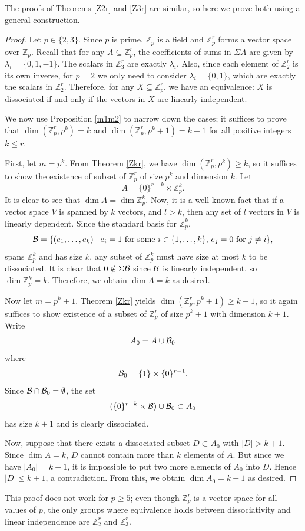 \documentclass[11pt]{article}
\newcommand{\Z}{\mathbb{Z}}
\begin{document}
The proofs of Theorems \ref{Z2r} and \ref{Z3r} are similar, so here we prove both using a general construction.
\begin{proof}
    Let $p\in\{2,3\}$. Since $p$ is prime, $\Z_p$ is a field and $\Z_p^r$ forms a vector space over $\Z_p$. Recall that for any $A\subseteq \Z_p^r$, the coefficients of sums in $\Sigma A$ are given by $\lambda_i=\{0,1,-1\}$. The scalars in $\Z_3^r$ are exactly $\lambda_i$. Also, since each element of $\Z_2^r$ is its own inverse, for $p=2$ we only need to consider $\lambda_i=\{0,1\}$, which are exactly the scalars in $\Z_2^r$. Therefore, for any $X\subseteq \Z_p^r$, we have an equivalence: $X$ is dissociated if and only if the vectors in $X$ are linearly independent. 
    
    We now use Proposition \ref{m1m2} to narrow down the cases; it suffices to prove that $\dim(\Z_p^r,p^k)=k$ and $\dim(\Z_p^r,p^k+1)=k+1$ for all positive integers $k\leq r$.
    
    First, let $m=p^k$. From Theorem \ref{Zkr}, we have $\dim(\Z_p^r,p^k)\geq k$, so it suffices to show the existence of subset of $\Z_p^r$ of size $p^k$ and dimension $k$. Let
    \[A=\{0\}^{r-k}\times\Z_p^k.\]
    It is clear to see that $\dim A=\dim\Z_p^k$. Now, it is a well known fact that if a vector space $V$ is spanned by $k$ vectors, and $l>k$, then any set of $l$ vectors in $V$ is linearly dependent. Since the standard basis for $\Z_p^k$,
    \[\mathcal{B}=\{(e_1,\ldots,e_k)\mid e_i=1 \text{ for some }i\in \{1,\ldots,k\},\,e_j=0\text{ for }j\neq i\},\]
    spans $\Z_p^k$ and has size $k$, any subset of $\Z_p^k$ must have size at most $k$ to be dissociated. It is clear that $0\notin\Sigma\mathcal{B}$ since $\mathcal{B}$ is linearly independent, so $\dim\Z_p^k=k$. Therefore, we obtain $\dim A = k$ as desired.
    
    \vspace{1em}
    Now let $m=p^k+1$. Theorem \ref{Zkr} yields $\dim(\Z_p^r, p^k+1)\geq k+1$, so it again suffices to show existence of a subset of $\Z_p^r$ of size $p^k+1$ with dimension $k+1$. Write
    \[A_0=A\cup\mathcal{B}_0\]
    where
    \[\mathcal{B}_0=\{1\}\times \{0\}^{r-1}.\]
    Since $\mathcal{B}\cap\mathcal{B}_0=\emptyset$, the set
    \[(\{0\}^{r-k}\times\mathcal{B})\cup\mathcal{B}_0 \subset A_0\]
    has size $k+1$ and is clearly dissociated. 
    
    Now, suppose that there exists a dissociated subset $D\subset A_0$ with $|D|> k+1$. Since $\dim A =k$,  $D$ cannot contain more than $k$ elements of $A$. But since we have $|A_0|=k+1$, it is impossible to put two more elements of $A_0$ into $D$. Hence $|D|\leq k+1$, a contradiction. From this, we obtain $\dim A_0=k+1$ as desired.
\end{proof}
This proof does not work for $p\geq5$; even though $\Z_p^r$ is a vector space for all values of $p$, the only groups where equivalence holds between dissociativity and linear independence are $\Z_2^r$ and $\Z_3^r$.
\end{document}
